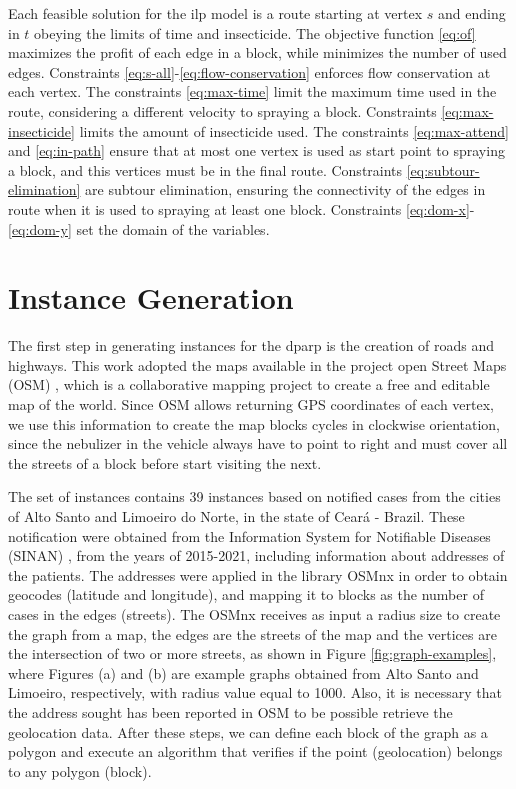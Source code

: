 \documentclass[a4paper,11pt]{article}
\begin{document}
Each feasible solution for the \gls{ilp} model is a route starting at vertex $s$
and ending  in $t$  obeying the  limits of time  and insecticide.  The objective
function  \eqref{eq:of} maximizes  the profit  of each  edge in  a block,  while
minimizes       the      number       of      used       edges.      Constraints
\eqref{eq:s-all}-\eqref{eq:flow-conservation} enforces flow conservation at each
vertex. The constraints  \eqref{eq:max-time} limit the maximum time  used in the
route,  considering  a  different  velocity to  spraying  a  block.  Constraints
\eqref{eq:max-insecticide}   limits  the   amount  of   insecticide  used.   The
constraints \eqref{eq:max-attend} and \eqref{eq:in-path} ensure that at most one
vertex is used as start point to spraying  a block, and this vertices must be in
the   final  route.   Constraints  \eqref{eq:subtour-elimination}   are  subtour
elimination, ensuring the connectivity of the edges  in route when it is used to
spraying at  least one block. Constraints  \eqref{eq:dom-x}-\eqref{eq:dom-y} set
the domain of the variables.

\section{Instance Generation} \label{sec:instance-generation}

The first  step in generating instances  for the \gls{dparp} is  the creation of
roads and  highways. This work  adopted the maps  available in the  project open
Street Maps (OSM) \citep{haklay:2008}, which  is a collaborative mapping project
to create a free  and editable map of the world. Since  OSM allows returning GPS
coordinates of  each vertex, we  use this information  to create the  map blocks
cycles in clockwise orientation, since the  nebulizer in the vehicle always have
to  point to  right and  must cover  all  the streets  of a  block before  start
visiting the next.

The set  of instances  contains 39  instances based on  notified cases  from the
cities of  Alto Santo and  Limoeiro do  Norte, in the  state of Ceará  - Brazil.
These  notification were  obtained from  the Information  System for  Notifiable
Diseases (SINAN) \citep{laguardia:2004}, from  the years of 2015-2021, including
information about addresses  of the patients. The addresses were  applied in the
library  OSMnx \citep{boeing:2017}  in order  to obtain  geocodes (latitude  and
longitude),  and mapping  it to  blocks  as the  number  of cases  in the  edges
(streets). The OSMnx receives as input a  radius size to create the graph from a
map, the edges are the streets of  the map and the vertices are the intersection
of  two or  more streets,  as  shown in  Figure \ref{fig:graph-examples},  where
Figures (a)  and (b) are example  graphs obtained from Alto  Santo and Limoeiro,
respectively, with  radius value equal to  1000. Also, it is  necessary that the
address sought has been reported in  OSM to be possible retrieve the geolocation
data. After these steps, we can define each  block of the graph as a polygon and
execute an  algorithm that verifies  if the  point (geolocation) belongs  to any
polygon (block).
\end{document}
